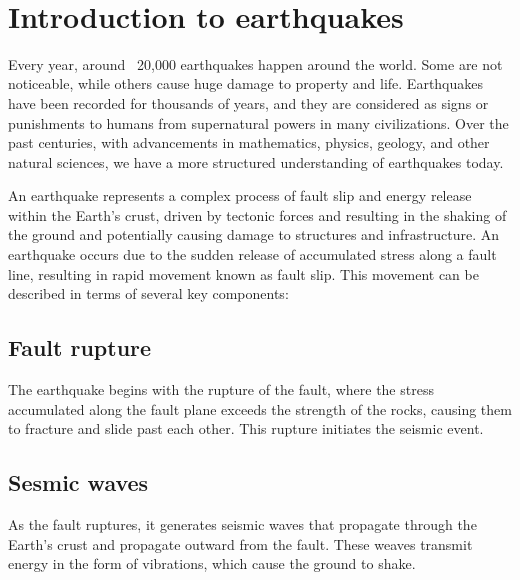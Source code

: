 ~\\

\section{Introduction to earthquakes}
Every year, around ~20,000 earthquakes happen around the world. Some are not noticeable, while others cause huge damage to property and life.
Earthquakes have been recorded for thousands of years, and they are considered as signs or punishments to humans from supernatural powers in many civilizations.
Over the past centuries, with advancements in mathematics, physics, geology, and other natural sciences, we have a more structured understanding of earthquakes today.

An earthquake represents a complex process of fault slip and energy release within the Earth's crust, driven by tectonic forces and resulting in the shaking of the ground and potentially causing damage to structures and infrastructure. 
An earthquake occurs due to the sudden release of accumulated stress along a fault line, resulting in rapid movement known as fault slip. This movement can be described in terms of several key components:

\subsection{Fault rupture}
The earthquake begins with the rupture of the fault, where the stress accumulated along the fault plane exceeds the strength of the rocks, causing them to fracture and slide past each other. This rupture initiates the seismic event.

\subsection{Sesmic waves} 
As the fault ruptures, it generates seismic waves that propagate through the Earth's crust and propagate outward from the fault.
These weaves transmit energy in the form of vibrations, which cause the ground to shake.

